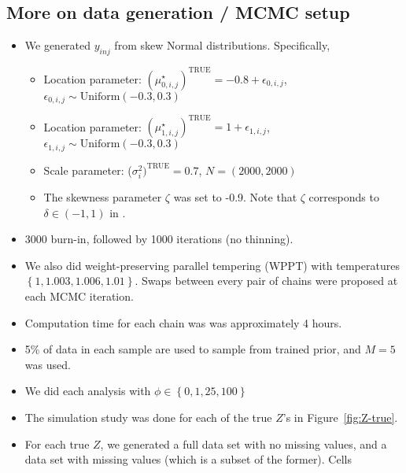 \documentclass[10pt]{article} %
\newcommand{\p}[1]{\left(#1\right)}
\newcommand{\bc}[1]{ \left\{#1\right\} }
\newcommand{\Uniform}{ \text{Uniform} }
\def\true{\text{TRUE}}
\begin{document}
\subsection{More on data generation / MCMC setup}
\begin{itemize}
  \item We generated $y_{inj}$ from skew Normal distributions. Specifically,
  \begin{itemize}
    \item Location parameter: $(\mu_{0,i,j}^\star)^\true=-0.8 +
      \epsilon_{0,i,j}$, $\epsilon_{0,i,j} \sim \Uniform(-0.3, 0.3)$
    \item Location parameter: $(\mu_{1,i,j}^\star)^\true=1 +
      \epsilon_{1,i,j}$, $\epsilon_{1,i,j} \sim \Uniform(-0.3, 0.3)$
    \item Scale parameter: ($\sigma^2_i)^\true=0.7$, $N=(2000, 2000)$
    \item The skewness parameter $\zeta$ was set to -0.9. Note that $\zeta$
          corresponds to $\delta \in \p{-1, 1}$ in \cite{fruhwirth2010bayesian}.
  \end{itemize}
  \item 3000 burn-in, followed by 1000 iterations (no thinning).
  \item We also did weight-preserving parallel tempering (WPPT) with temperatures 
        $\bc{1, 1.003, 1.006, 1.01}$. Swaps between every pair of chains were
        proposed at each MCMC iteration.
  \item Computation time for each chain was was approximately 4 hours.
  \item 5\% of data in each sample are used to sample from trained prior, and
    $M=5$ was used.
  \item We did each analysis with $\phi \in \bc{0, 1, 25, 100}$
  \item The simulation study was done for each of the true $Z$'s in 
        Figure~\ref{fig:Z-true}.
  \item For each true $Z$, we generated a full data set with no missing values,
        and a data set with missing values (which is a subset of the former). Cells

\end{itemize}
\end{document}
